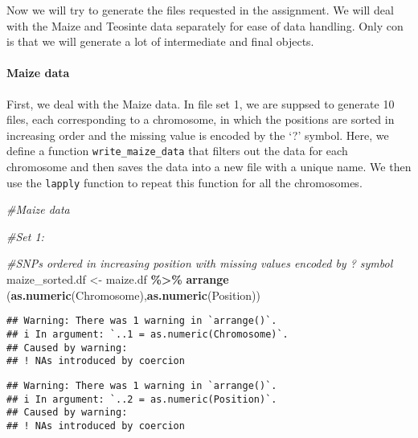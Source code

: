 \documentclass[
]{article}
\newenvironment{Shaded}{\begin{snugshade}}{\end{snugshade}}
\newcommand{\CommentTok}[1]{\textcolor[rgb]{0.56,0.35,0.01}{\textit{#1}}}
\newcommand{\FunctionTok}[1]{\textcolor[rgb]{0.13,0.29,0.53}{\textbf{#1}}}
\newcommand{\NormalTok}[1]{#1}
\newcommand{\OtherTok}[1]{\textcolor[rgb]{0.56,0.35,0.01}{#1}}
\newcommand{\SpecialCharTok}[1]{\textcolor[rgb]{0.81,0.36,0.00}{\textbf{#1}}}
\begin{document}
Now we will try to generate the files requested in the assignment. We
will deal with the Maize and Teosinte data separately for ease of data
handling. Only con is that we will generate a lot of intermediate and
final objects.

\paragraph{Maize data}\label{maize-data}

First, we deal with the Maize data. In file set 1, we are suppsed to
generate 10 files, each corresponding to a chromosome, in which the
positions are sorted in increasing order and the missing value is
encoded by the `?' symbol. Here, we define a function
\texttt{write\_maize\_data} that filters out the data for each
chromosome and then saves the data into a new file with a unique name.
We then use the \texttt{lapply} function to repeat this function for all
the chromosomes.

\begin{Shaded}
\begin{Highlighting}[]
\CommentTok{\#Maize data}

\CommentTok{\#Set 1:}

\CommentTok{\#SNPs ordered in increasing position with missing values encoded by \textquotesingle{}?\textquotesingle{} symbol}
\NormalTok{maize\_sorted.df }\OtherTok{\textless{}{-}}\NormalTok{ maize.df }\SpecialCharTok{\%\textgreater{}\%}
  \FunctionTok{arrange}\NormalTok{ (}\FunctionTok{as.numeric}\NormalTok{(Chromosome),}\FunctionTok{as.numeric}\NormalTok{(Position))}
\end{Highlighting}
\end{Shaded}

\begin{verbatim}
## Warning: There was 1 warning in `arrange()`.
## i In argument: `..1 = as.numeric(Chromosome)`.
## Caused by warning:
## ! NAs introduced by coercion
\end{verbatim}

\begin{verbatim}
## Warning: There was 1 warning in `arrange()`.
## i In argument: `..2 = as.numeric(Position)`.
## Caused by warning:
## ! NAs introduced by coercion
\end{verbatim}
\end{document}
